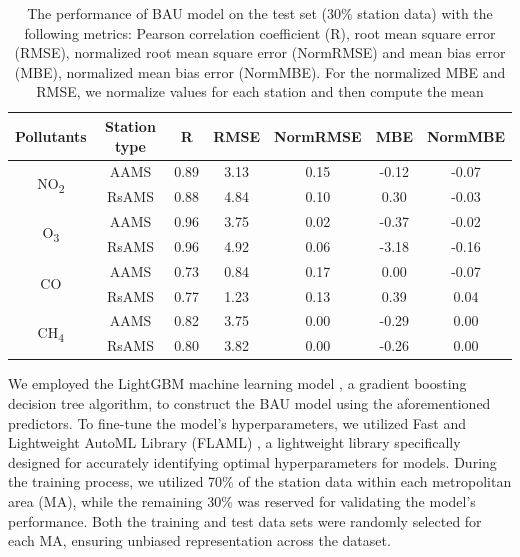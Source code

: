 \begin{table}[!ht]
    \centering
    \caption[Model performance evaluation]{The performance of BAU model on the test set (30\% station data) with the following metrics: Pearson correlation coefficient (R), root mean square error (RMSE), normalized root mean square error (NormRMSE) and mean bias error (MBE), normalized mean bias error (NormMBE). For the normalized MBE and RMSE, we normalize values for each station and then compute the mean}
    \begin{tabular}{c c c c c c c}
        \hline
        Pollutants & Station type & R & RMSE & NormRMSE & MBE & NormMBE \\ \hline
        \multirow{2}{*}{NO\textsubscript{2}}    & AAMS & 0.89 & 3.13 & 0.15 & -0.12 & -0.07  \\
            & RsAMS & 0.88 & 4.84 & 0.10 & 0.30 & -0.03  \\ \hline
        \multirow{2}{*}{O\textsubscript{3}}    & AAMS & 0.96 & 3.75 & 0.02 & -0.37 & -0.02  \\
            & RsAMS & 0.96 & 4.92 & 0.06 & -3.18 & -0.16  \\ \hline
        \multirow{2}{*}{CO}    & AAMS & 0.73 & 0.84 & 0.17 & 0.00 & -0.07  \\
            & RsAMS & 0.77 & 1.23 & 0.13 & 0.39 & 0.04  \\ \hline
        \multirow{2}{*}{CH\textsubscript{4}}    & AAMS & 0.82 & 3.75 & 0.00 & -0.29 & 0.00  \\
            & RsAMS & 0.80 & 3.82 & 0.00 & -0.26 & 0.00  \\ \hline
    \end{tabular}
    \label{tab:chap4_tab1}
\end{table}

We employed the LightGBM machine learning model \citep{ke2017lightgbm}, a gradient boosting decision tree algorithm, to construct the BAU model using the aforementioned predictors. To fine-tune the model's hyperparameters, we utilized Fast and Lightweight AutoML Library (FLAML) \citep{wang2021flaml}, a lightweight library specifically designed for accurately identifying optimal hyperparameters for models. During the training process, we utilized 70\% of the station data within each metropolitan area (MA), while the remaining 30\% was reserved for validating the model's performance. Both the training and test data sets were randomly selected for each MA, ensuring unbiased representation across the dataset.\par

